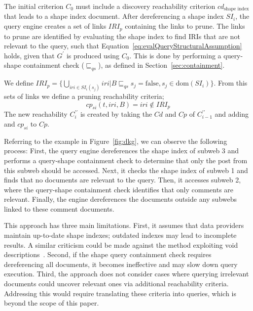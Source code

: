 The initial criterion $C_0$ must include a discovery reachability criterion $cd_{\text{shape index}}$ that leads to a shape index document.  
After dereferencing a shape index $SI_i$, the query engine creates a set of links $IRI_p$ containing the links to prune.  
The links to prune are identified by evaluating the shape index to find IRIs that are not relevant to the query, such that Equation~\ref{eq:evalQueryStructuralAssumption} holds, given that $G^{\prime}$ is produced using $C_0$.  
This is done by performing a query-shape containment check ($\sqsubseteq_{qs}$), as defined in Section~\ref{sec:containment}.

We define
$IRI_p = \{ \bigcup_{iri \in SI_i(s_j)} iri | B \sqsubseteq_{qs}  s_j = \mathrm{false}, s_j \in \text{dom}(SI_i) \}$.
From this sets of links we define a pruning reachability criteria;
\begin{equation}
       cp_{si}(t, iri, B) = iri \notin IRI_p
\end{equation}
The new reachability $C^{\prime\prime}_i$ is created by taking the $Cd$ and $Cp$ of $C^{\prime\prime}_{i-1}$ and adding
and $cp_{si}$ to $Cp$.

Referring to the example in Figure~\ref{fig:dkg}, we can observe the following process:
First, the query engine dereferences the shape index of subweb 3 and performs a query-shape containment check to determine that only the post from this subweb should be accessed.
Next, it checks the shape index of subweb 1 and finds that no documents are relevant to the query.
Then, it accesses subweb 2, where the query-shape containment check identifies that only comments are relevant.
Finally, the engine dereferences the documents outside any subwebs linked to these comment documents.

This approach has three main limitations.  
First, it assumes that data providers maintain up-to-date shape indexes; outdated indexes may lead to incomplete results.
A similar criticism could be made against the method exploiting void descriptions~\cite{Montoya2017}.
Second, if the shape query containment check requires dereferencing all documents, it becomes ineffective and may slow down query execution.  
Third, the approach does not consider cases where querying irrelevant documents could uncover relevant ones via additional reachability criteria.  
Addressing this would require translating these criteria into queries, which is beyond the scope of this paper.

